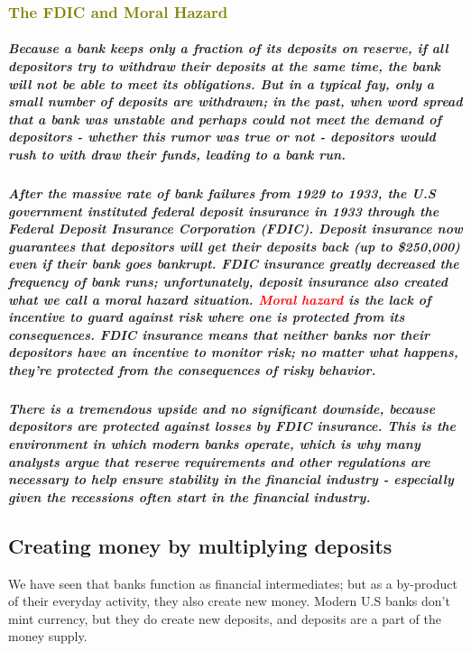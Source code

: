 \documentclass[11pt]{article} %
\begin{document}
\subsubsection*{\textcolor{olive}{The FDIC and Moral Hazard}}
\subparagraph*{Because a bank keeps only a fraction of its deposits on reserve, if all depositors try to withdraw their deposits at the same time, the bank will not be able to meet its obligations. But in a typical fay, only a small number of deposits are withdrawn; in the past, when word spread that a bank was unstable and perhaps could not meet the demand of depositors - whether this rumor was true or not - depositors would rush to with draw their funds, leading to a bank run.}
\subparagraph*{After the massive rate of bank failures from 1929 to 1933, the U.S government instituted federal deposit insurance in 1933 through the Federal Deposit Insurance Corporation (FDIC). Deposit insurance now guarantees that depositors will get their deposits back (up to \$250,000) even if their bank goes bankrupt. FDIC insurance greatly decreased the frequency of bank runs; unfortunately, deposit insurance also created what we call a moral hazard situation. \textbf{\textcolor{red}{Moral hazard}} is the lack of incentive to guard against risk where one is protected from its consequences. FDIC insurance means that neither banks nor their depositors have an incentive to monitor risk; no matter what happens, they're protected from the consequences of risky behavior.}
\subparagraph*{There is a tremendous upside and no significant downside, because depositors are protected against losses by FDIC insurance. This is the environment in which modern banks operate, which is why many analysts argue that reserve requirements and other regulations are necessary to help ensure stability in the financial industry - especially given the recessions often start in the financial industry.}
\subsection*{\textbf{Creating money by multiplying deposits}}
We have seen that banks function as financial intermediates; but as a by-product of their everyday activity, they also create new money. Modern U.S banks don't mint currency, but they do create new deposits, and deposits are a part of the money supply.
\end{document}
